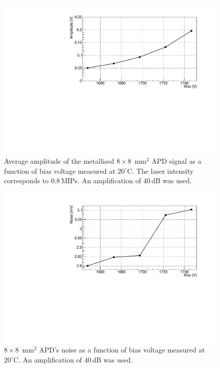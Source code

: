 \documentclass[3p,preprint,twocolumn]{elsarticle}
\begin{document}
\begin{figure}
  \centering
  \includegraphics[width = \columnwidth]{ampli8x8metal}
  \caption{Average amplitude of the metallised $8 \times 8$~mm$^2$ APD signal as a function of bias voltage measured at $20^\circ$C. The laser intensity corresponds to 0.8\,MIPs. An amplification of 40\,dB was used.}
  \label{fig:ampli8x8metal}
\end{figure}

\begin{figure}
  \centering
  \includegraphics[width = \columnwidth]{noise8x8metal}
  \caption{$8 \times 8$~mm$^2$ APD's noise as a function of bias voltage measured at $20^\circ$C. An amplification of 40\,dB was used.}
  \label{fig:noise8x8metal}
\end{figure}
\end{document}
